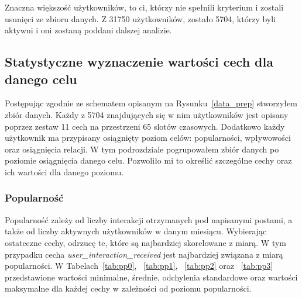 \documentclass[polish,12pt]{aghthesis}
\begin{document}
\FloatBarrier

Znaczna większość użytkowników, to ci, którzy nie spełnili kryterium i zostali usunięci ze zbioru danych. Z 31750 użytkowników, zostało 5704, którzy byli aktywni i oni zostaną poddani dalszej analizie.

\subsection{Statystyczne wyznaczenie wartości cech dla danego celu}

Postępując zgodnie ze schematem opisanym na Rysunku~\ref{data_prep} stworzyłem zbiór danych. Każdy z 5704 znajdujących się w nim użytkowników jest opisany poprzez zestaw 11 cech na przestrzeni 65 slotów czasowych. Dodatkowo każdy użytkownik ma przypisany osiągnięty poziom celów: popularności, wpływowości oraz osiągnięcia relacji. W tym podrozdziale pogrupowałem zbiór danych po poziomie osiągnięcia danego celu. Pozwoliło mi to określić szczególne cechy oraz ich wartości dla danego poziomu.

\subsubsection{Popularność}

Popularność zależy od liczby interakcji otrzymanych pod napisanymi postami, a także od liczby aktywnych użytkowników w danym miesiącu. Wybierając ostateczne cechy, odrzucę te, które są najbardziej skorelowane z miarą. W tym przypadku cecha \textit{user\_interaction\_received} jest najbardziej związana z miarą popularności. W Tabelach~\ref{tab:pp0}, ~\ref{tab:pp1}, ~\ref{tab:pp2} oraz ~\ref{tab:pp3} przedstawione wartości minimalne, średnie, odchylenia standardowe oraz wartości maksymalne dla każdej cechy w zależności od poziomu popularności.
\end{document}
